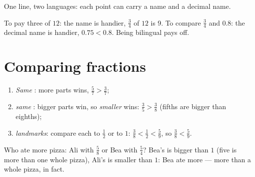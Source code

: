 \begin{omfigure}

{\small One line, two languages: each point can carry a  name
and a decimal name.}
\end{omfigure}

\begin{example}\label{ex:g5:fractions:choose}
To pay three  of $12$: the  name is handier,
$\frac34$ of $12$ is $9$. To compare $\frac34$ and $0.8$: the
decimal name is handier, $0.75 < 0.8$. Being bilingual pays off.
\end{example}

\section{Comparing fractions}

\begin{method}\label{met:g5:fractions:compare}
\begin{enumerate}
  \item \emph{Same }: more parts wins,
        $\frac57 > \frac37$;
  \item \emph{same }: bigger parts win, so \emph{smaller}
         wins: $\frac35 > \frac38$ (fifths are bigger
        than eighths);
  \item \emph{landmarks}: compare each to $\frac12$ or to $1$:
        $\frac38 < \frac12 < \frac59$, so $\frac38 < \frac59$.
\end{enumerate}
\end{method}

\begin{example}\label{ex:g5:fractions:compare}
Who ate more pizza: Ali with $\frac58$ or Bea with $\frac54$? Bea's
 is bigger than $1$ (five  is more than one whole
pizza), Ali's is smaller than $1$: Bea ate more --- more than a
whole pizza, in fact.
\end{example}

